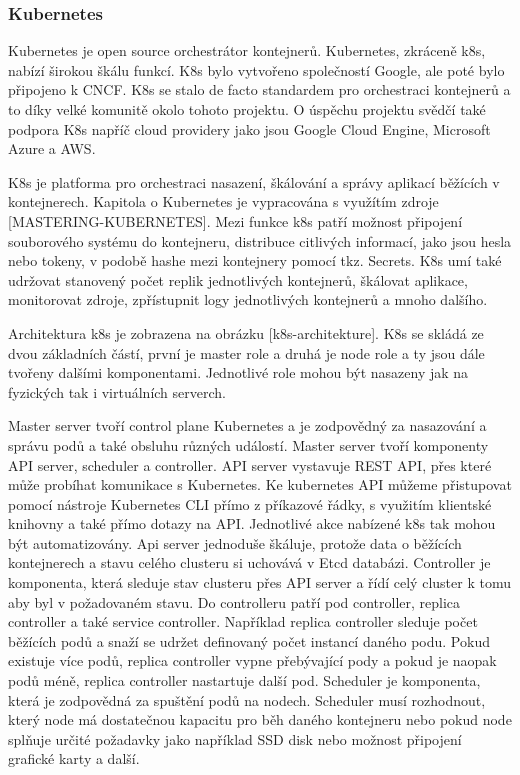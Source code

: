 \subsubsection{Kubernetes}
Kubernetes je open source orchestrátor kontejnerů. Kubernetes, zkráceně k8s, nabízí širokou škálu funkcí. K8s bylo vytvořeno společností Google, ale poté bylo připojeno k CNCF. K8s se stalo de facto standardem pro orchestraci kontejnerů a to díky velké komunitě okolo tohoto projektu. O úspěchu projektu svědčí také podpora K8s napříč cloud providery jako jsou Google Cloud Engine, Microsoft Azure a AWS. \par
K8s je platforma pro orchestraci nasazení, škálování a správy aplikací běžících v kontejnerech. Kapitola o Kubernetes je vypracována s využítím zdroje [MASTERING-KUBERNETES]. Mezi funkce k8s patří možnost připojení souborového systému do kontejneru, distribuce citlivých informací, jako jsou hesla nebo tokeny, v podobě hashe mezi kontejnery pomocí tkz. Secrets. K8s umí také udržovat stanovený počet replik jednotlivých kontejnerů, škálovat aplikace, monitorovat zdroje, zpřístupnit logy jednotlivých kontejnerů a mnoho dalšího. \par
Architektura k8s je zobrazena na obrázku [k8s-architekture]. K8s se skládá ze dvou základních částí, první je master role a druhá je node role a ty jsou dále tvořeny dalšími komponentami. Jednotlivé role mohou být nasazeny jak na fyzických tak i virtuálních serverch. \par
Master server tvoří control plane Kubernetes a je zodpovědný za nasazování a správu podů a také obsluhu různých událostí. Master server tvoří komponenty API server, scheduler a controller. API server vystavuje REST API, přes které může probíhat komunikace s Kubernetes. Ke kubernetes API můžeme přistupovat pomocí nástroje Kubernetes CLI přímo z příkazové řádky, s využitím klientské knihovny a také přímo dotazy na API. Jednotlivé akce nabízené k8s tak mohou být automatizovány. Api server jednoduše škáluje, protože data o běžících kontejnerech a stavu celého clusteru si uchovává v Etcd databázi. Controller je komponenta, která sleduje stav clusteru přes API server a řídí celý cluster k tomu aby byl v požadovaném stavu. Do controlleru patří pod controller, replica controller a také service controller. Například replica controller sleduje počet běžících podů a snaží se udržet definovaný počet instancí daného podu. Pokud existuje více podů, replica controller vypne přebývající pody a pokud je naopak podů méně, replica controller nastartuje další pod. Scheduler je komponenta, která je zodpovědná za spuštění podů na nodech. Scheduler musí rozhodnout, který node má dostatečnou kapacitu pro běh daného kontejneru nebo pokud node splňuje určité požadavky jako například SSD disk nebo možnost připojení grafické karty a další.     \par          
